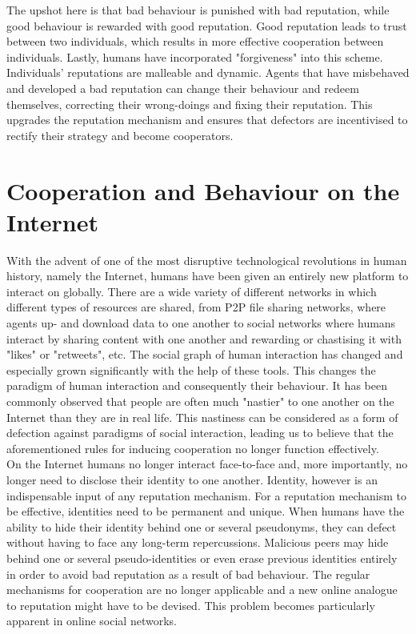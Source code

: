 \noindent{}The upshot here is that bad behaviour is punished with bad reputation, while good behaviour is rewarded with good reputation. Good reputation leads to trust between two individuals, which results in more effective cooperation between individuals. Lastly, humans have incorporated "forgiveness" into this scheme. Individuals' reputations are malleable and dynamic. Agents that have misbehaved and developed a bad reputation can change their behaviour and redeem themselves, correcting their wrong-doings and fixing their reputation. This upgrades the reputation mechanism and ensures that defectors are incentivised to rectify their strategy and become cooperators.\vspace{1em}\\


\section{Cooperation and Behaviour on the Internet}
\label{sec:Cooperation and Behaviour on the Internet}
\noindent{}With the advent of one of the most disruptive technological revolutions in human history, namely the Internet, humans have been given an entirely new platform to interact on globally. There are a wide variety of different networks in which different types of resources are shared, from P2P file sharing networks, where agents up- and download data to one another to social networks where humans interact by sharing content with one another and rewarding or chastising it with "likes" or "retweets", etc. The social graph of human interaction has changed and especially grown significantly with the help of these tools. This changes the paradigm of human interaction and consequently their behaviour. It has been commonly observed that people are often much "nastier" to one another on the Internet than they are in real life. This nastiness can be considered as a form of defection against paradigms of social interaction, leading us to believe that the aforementioned rules for inducing cooperation no longer function effectively.\vspace{1em}\\

\noindent{}On the Internet humans no longer interact face-to-face and, more importantly, no longer need to disclose their identity to one another. Identity, however is an indispensable input of any reputation mechanism. For a reputation mechanism to be effective, identities need to be permanent and unique. When humans have the ability to hide their identity behind one or several pseudonyms, they can defect without having to face any long-term repercussions. Malicious peers may hide behind one or several pseudo-identities or even erase previous identities entirely in order to avoid bad reputation as a result of bad behaviour. The regular mechanisms for cooperation are no longer applicable and a new online analogue to reputation might have to be devised. This problem becomes particularly apparent in online social networks.\vspace{1em}\\

